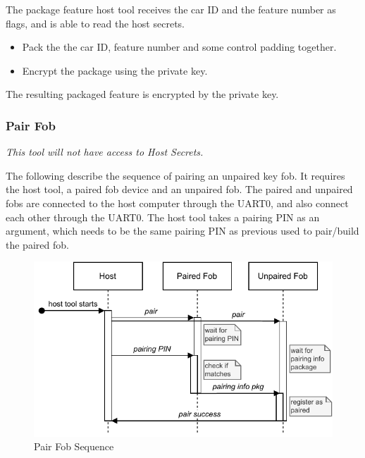 \documentclass[11pt,oneside,onecolumn,letterpaper]{article}
\begin{document}
The package feature host tool receives the car ID and the feature number as flags, and is able to read the host secrets.
\begin{itemize}
	\item Pack the the car ID, feature number and some control padding together.
	\item Encrypt the package using the private key.
\end{itemize}

The resulting packaged feature is encrypted by the private key.

\subsubsection{Pair Fob}

\textit{This tool will not have access to Host Secrets.}

The following describe the sequence of pairing an unpaired key fob. It requires the host tool, a paired fob device and an unpaired fob. The paired and unpaired fobs are connected to the host computer through the UART0, and also connect each other through the UART0. The host tool takes a pairing PIN as an argument, which needs to be the same pairing PIN as previous used to pair/build the paired fob.

\begin{figure}[!htbp]
	\begin{centering}
		\includegraphics[width = .6\textwidth]{pic/pair.pdf}
		\caption{Pair Fob Sequence}
		\label{fig:pair}
	\end{centering}
\end{figure}
\end{document}
